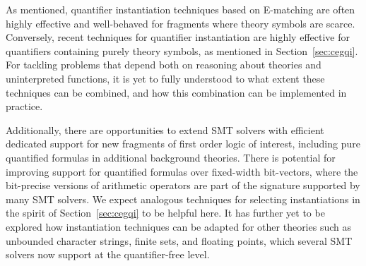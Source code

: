 \documentclass{easychair}
\begin{document}
As mentioned, quantifier instantiation techniques based on E-matching
are often highly effective and well-behaved for fragments where theory symbols are scarce.
Conversely, recent techniques for quantifier instantiation are highly effective for quantifiers containing purely theory symbols,
as mentioned in Section~\ref{sec:cegqi}.
For tackling problems that depend both on reasoning about theories and uninterpreted functions,
it is yet to fully understood to what extent these techniques can be combined,
and how this combination can be implemented in practice.

Additionally, there are opportunities to extend SMT solvers with efficient dedicated support for
new fragments of first order logic of interest, including pure quantified formulas in additional background theories.
There is potential for improving support for quantified formulas over fixed-width bit-vectors,
where the bit-precise versions of arithmetic operators are part of the signature supported by many SMT solvers.
We expect analogous techniques for selecting instantiations in the spirit of Section~\ref{sec:cegqi} to be helpful here.
It has further yet to be explored how instantiation techniques can be adapted
for other theories such as unbounded character strings, finite sets, and floating points, 
which several SMT solvers now support at the quantifier-free level.



\end{document}
